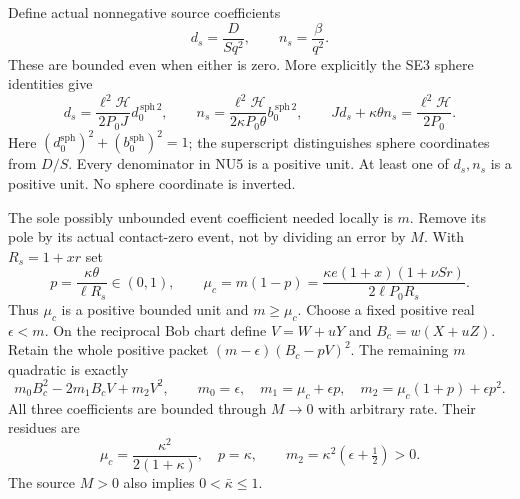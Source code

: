 Define actual nonnegative source coefficients
\[
 d_s=\frac{D}{Sq^2},\qquad n_s=\frac\beta{q^2}.
 \tag{NU4}
\]
These are bounded even when either is zero. More explicitly the
SE3 sphere identities give
\[
 d_s=\frac{\ell^2\mathcal H}{2P_0J}d_0^{\,\mathrm{sph}\,2},
 \qquad
 n_s=\frac{\ell^2\mathcal H}{2\kappa P_0\theta}
                                   b_0^{\,\mathrm{sph}\,2},
 \qquad
 Jd_s+\kappa\theta n_s=\frac{\ell^2\mathcal H}{2P_0}.
 \tag{NU5}
\]
Here $(d_0^{\mathrm{sph}})^2+(b_0^{\mathrm{sph}})^2=1$;
the superscript distinguishes sphere coordinates from $D/S$.
Every denominator in NU5 is a positive unit. At least one of
$d_s,n_s$ is a positive unit. No sphere coordinate is inverted.

The sole possibly unbounded event coefficient needed locally is
$m$. Remove its pole by its actual contact-zero event, not by
dividing an error by $M$. With $R_s=1+xr$ set
\[
 p=\frac{\kappa\theta}{\ell R_s}\in(0,1),\qquad
 \mu_c=m(1-p)=
 \frac{\kappa e(1+x)(1+\nu Sr)}{2\ell P_0R_s}.
 \tag{NU6}
\]
Thus $\mu_c$ is a positive bounded unit and $m\ge\mu_c$.
Choose a fixed positive real $\epsilon<m$. On the reciprocal
Bob chart define $V=W+uY$ and $B_c=w(X+uZ)$. Retain the whole
positive packet $(m-\epsilon)(B_c-pV)^2$. The remaining $m$
quadratic is exactly
\[
 m_0B_c^2-2m_1B_cV+m_2V^2,\qquad
 m_0=\epsilon,\quad m_1=\mu_c+\epsilon p,\quad
 m_2=\mu_c(1+p)+\epsilon p^2.
 \tag{NU7}
\]
All three coefficients are bounded through $M\to0$ with arbitrary
rate. Their residues are
\[
 \mu_c=\frac{\kappa^2}{2(1+\kappa)},\quad p=\kappa,
 \qquad m_2=\kappa^2(\epsilon+\tfrac12)>0.
 \tag{NU8}
\]
The source $M>0$ also implies $0<\bar\kappa\le1$.

